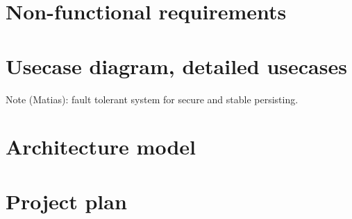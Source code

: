 \documentclass{article}
\begin{document}
\section{Non-functional requirements}

\section{Usecase diagram, detailed usecases}

Note (Matias): fault tolerant system for secure and stable persisting.

\section{Architecture model}

\section{Project plan}
\end{document}
